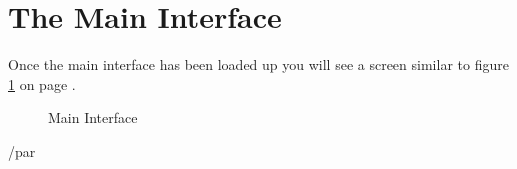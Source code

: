 \documentclass[11pt,twoside]{book}
\begin{document}
\section{The Main Interface}

Once the main interface has been loaded up you will see a screen similar
to figure \ref{figure:interface} on page \pageref{figure:interface}.

{ \begin{figure}
\caption{\label{figure:interface}Main Interface}
\end{figure}
/par}
\end{document}
